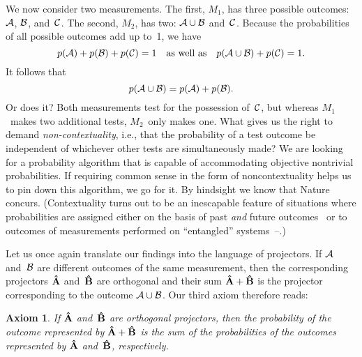 \documentclass[12pt]{article}
\newtheorem{axiom}{Axiom}
\newcommand{\bax}{\begin{axiom}}
\newcommand{\eax}{\end{axiom}}
\newcommand{\be}{\begin{equation}}
\newcommand{\ee}{\end{equation}}
\newcommand{\cA}{{\cal A}}
\newcommand{\cB}{{\cal B}}
\newcommand{\cC}{{\cal C}}
\newcommand{\hA}{{\bf\hat A}}
\newcommand{\hB}{{\bf\hat B}}
\begin{document}
We now consider two measurements. The first, $M_1$, has three possible outcomes: $\cA$, $\cB$, and~$\cC$. The second, $M_2$, has two: $\cA\cup\cB$ and~$\cC$. Because the probabilities of all possible outcomes add up to~1, we have
\be
p(\cA)+p(\cB)+p(\cC)=1 \quad\hbox{as well as}\quad p(\cA\cup\cB)+p(\cC)=1.
\ee
It follows that
\be
p(\cA\cup\cB)=p(\cA)+p(\cB).
\label{EQaddi}
\ee
Or does it? Both measurements test for the possession of~$\cC$, but whereas $M_1$~makes two additional tests, $M_2$~only makes one. What gives us the right to demand \textit{non-contextuality}, i.e., that the probability of a test outcome be independent of whichever other tests are simultaneously made? We are looking for a probability algorithm that is capable of accommodating objective nontrivial probabilities. If requiring common sense in the form of noncontextuality helps us to pin down this algorithm, we go for it. By hindsight we know that Nature concurs. (Contextuality turns out to be an inescapable feature of situations where probabilities are assigned either on the basis of past \textit{and} future outcomes~\cite{Mohrhoff01} or to outcomes of measurements performed on ``entangled'' systems~\cite{PeresCh7}--\cite{Clifton}.) 

Let us once again translate our findings into the language of projectors. If $\cA$ and~$\cB$ are different outcomes of the same measurement, then the corresponding projectors $\hA$ and~$\hB$ are orthogonal and their sum $\hA+\hB$ is the projector corresponding to the outcome $\cA\cup\cB$. Our third axiom therefore reads:
\bax
If $\hA$ and~$\hB$ are orthogonal projectors, then the probability of the outcome represented by $\hA+\hB$ is the sum of the probabilities of the outcomes represented by $\hA$ and~$\hB$, respectively.
\eax
\end{document}
